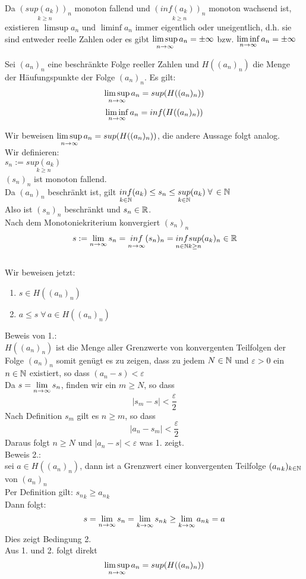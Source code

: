\documentclass[../ana1u.tex]{subfiles}
\begin{document}
\begin{bem}
    Da \(\underset{k \geq n}{(sup(a_k))_n}\) monoton fallend und \(\underset{k \geq n}{(inf(a_k))_n}\) monoton wachsend ist, existieren \(\limsup a_n \) und \(\liminf a_n\) immer eigentlich oder uneigentlich, d.h. sie sind entweder reelle Zahlen oder es gibt \(\limsup\limits_{n\rightarrow\infty} a_n = \pm \infty \) bzw. \(\liminf\limits_{n\rightarrow\infty} a_n = \pm \infty \) 
\end{bem}
\begin{lem}
    Sei \((a_n)_n\) eine beschränkte Folge reeller Zahlen und \(H((a_n)_n)\) die Menge der Häufungspunkte der Folge \((a_n)_n\). Es gilt:\\
    \[\limsup\limits_{n\rightarrow\infty} a_n = sup(H((a_n)_n))\]
    \[\liminf\limits_{n\rightarrow\infty} a_n = inf(H((a_n)_n))\]
\end{lem}
\begin{bew}
    Wir beweisen \(\limsup\limits_{n\rightarrow\infty} a_n = sup(H((a_n)_n))\), die andere Aussage folgt analog.\\
    Wir definieren:\\
    \(s_n := \underset{k \geq n}{sup(a_k)}\)\\
    \((s_n)_n\) ist monoton fallend.\\
    Da \((a_n)_n\) beschränkt ist, gilt \(\underset{k \in \mathbb{N}}{inf}(a_k) \leq s_n \leq \underset{k \in \mathbb{N}}{sup}(a_k) \; \forall \, \in \mathbb{N}\)\\
    Also ist \((s_n)_n\) beschränkt und \(s_n \in \mathbb{R}\).\\
    Nach dem Monotoniekriterium konvergiert \((s_n)_n\)\\
    \[s := \lim\limits_{n\rightarrow\infty} s_n = \underset{n \rightarrow \infty}{inf}(s_n)_n = \underset{n \in \mathbb{N}}{inf}\underset{k \geq n}{sup}(a_k)_n \in \mathbb{R}\]\\
    Wir beweisen jetzt:
    \begin{enumerate}
        \item \(s \in H((a_n)_n)\)
        \item \(a \leq s \; \forall \, a \in H((a_n)_n)\)
    \end{enumerate}
    Beweis von 1.:\\
    \(H((a_n)_n)\) ist die Menge aller Grenzwerte von konvergenten Teilfolgen der Folge \((a_n)_n\) somit genügt es zu zeigen, dass zu jedem \(N \in \mathbb{N}\) und \(\varepsilon > 0\) ein \(n \in \mathbb{N}\) existiert, so dass \((a_n - s) < \varepsilon\)\\
    Da \(s = \lim\limits_{n\rightarrow\infty} s_n\), finden wir ein \(m \geq N\), so dass 
    \[|s_m - s| < \frac{\varepsilon}{2}\]
    Nach Definition \(s_m\) gilt es \(n \geq m\), so dass
    \[|a_n - s_m| < \frac{\varepsilon}{2}\]
    Daraus folgt \(n \geq N\) und \(|a_n - s| < \varepsilon\) was 1. zeigt.\\
    Beweis 2.:\\
    sei \(a \in H((a_n)_n)\), dann ist a Grenzwert einer konvergenten Teilfolge \(({a_n}_k)_{k \in \mathbb{N}}\) von \((a_n)_n\)\\
    Per Definition gilt: \({s_n}_k \geq {a_n}_k\)\\
    Dann folgt:
    \[s = \lim\limits_{n\rightarrow\infty} s_n = \lim\limits_{k\rightarrow\infty} {s_n}_k \geq \lim\limits_{k\rightarrow\infty} {a_n}_k = a\]
    Dies zeigt Bedingung 2.\\
    Aus 1. und 2. folgt direkt
    \[\limsup\limits_{n\rightarrow\infty} a_n = sup(H((a_n)_n))\]
\end{bew}
\end{document}
